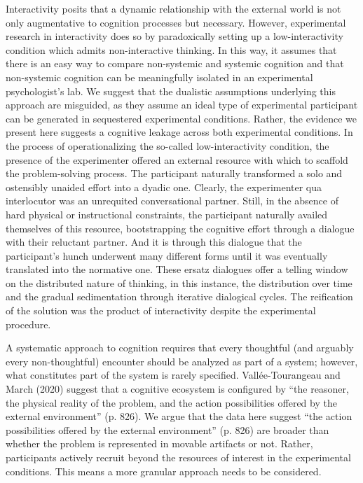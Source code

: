 Interactivity posits that a dynamic relationship with the external world
is not only augmentative to cognition processes but necessary. However,
experimental research in interactivity does so by paradoxically setting
up a low-interactivity condition which admits non-interactive thinking.
In this way, it assumes that there is an easy way to compare
non-systemic and systemic cognition and that non-systemic cognition can
be meaningfully isolated in an experimental psychologist's lab. We
suggest that the dualistic assumptions underlying this approach are
misguided, as they assume an ideal type of experimental participant can
be generated in sequestered experimental conditions. Rather, the
evidence we present here suggests a cognitive leakage across both
experimental conditions. In the process of operationalizing the
so-called low-interactivity condition, the presence of the experimenter
offered an external resource with which to scaffold the problem-solving
process. The participant naturally transformed a solo and ostensibly
unaided effort into a dyadic one. Clearly, the experimenter qua
interlocutor was an unrequited conversational partner. Still, in the
absence of hard physical or instructional constraints, the participant
naturally availed themselves of this resource, bootstrapping the
cognitive effort through a dialogue with their reluctant partner. And it
is through this dialogue that the participant's hunch underwent many
different forms until it was eventually translated into the normative
one. These ersatz dialogues offer a telling window on the distributed
nature of thinking, in this instance, the distribution over time and the
gradual sedimentation through iterative dialogical cycles. The
reification of the solution was the product of interactivity despite the
experimental procedure.

A systematic approach to cognition requires that every thoughtful (and
arguably every non-thoughtful) encounter should be analyzed as part of a
system; however, what constitutes part of the system is rarely
specified. Vallée-Tourangeau and March (2020) suggest that a cognitive
ecosystem is configured by ``the reasoner, the physical reality of the
problem, and the action possibilities offered by the external
environment'' (p. 826). We argue that the data here suggest ``the action
possibilities offered by the external environment'' (p. 826) are broader
than whether the problem is represented in movable artifacts or not.
Rather, participants actively recruit beyond the resources of interest
in the experimental conditions. This means a more granular approach
needs to be considered.


